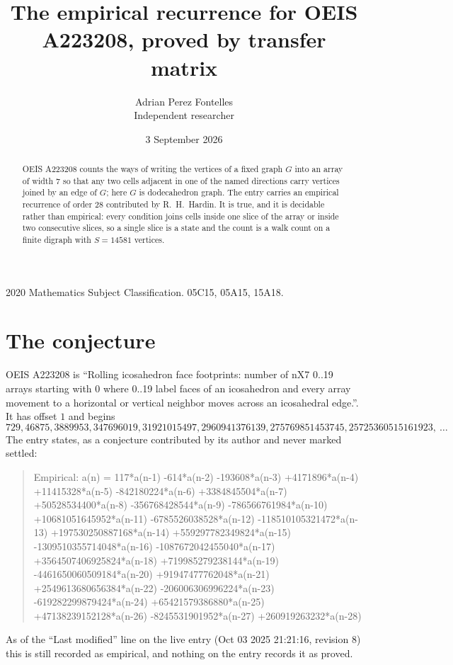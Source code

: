 \documentclass[11pt,a4paper]{article}
\title{The empirical recurrence for OEIS A223208, proved by transfer matrix}
\author{Adrian Perez Fontelles\\ \small Independent researcher}
\date{3 September 2026}
\theoremstyle{plain}
\theoremstyle{definition}
\begin{document}
\maketitle

\begin{abstract}
OEIS A223208 counts the ways of writing the vertices of a fixed graph $G$ into an array of width
$7$ so that any two cells adjacent in one of the named directions carry vertices joined by an
edge of $G$; here $G$ is dodecahedron graph. The entry carries an empirical recurrence of order $28$
contributed by R.~H.~Hardin. It is true, and it is decidable rather than empirical: every
condition joins cells inside one slice of the array or inside two consecutive slices, so a
single slice is a state and the count is a walk count on a finite digraph with $S=14581$ vertices.
\end{abstract}

\noindent\small 2020 Mathematics Subject Classification. 05C15, 05A15, 15A18.\normalsize

\section{The conjecture}

OEIS A223208 is ``Rolling icosahedron face footprints: number of nX7 0..19 arrays starting with 0 where 0..19 label faces of an icosahedron and every array movement to a horizontal or vertical neighbor moves across an icosahedral edge.''. It has offset $1$ and begins
\[
729, 46875, 3889953, 347696019, 31921015497, 2960941376139, 275769851453745, 25725360515161923,\ \dots
\]
The entry states, as a conjecture contributed by its author and never marked settled:
\begin{quote}
Empirical: a(n) = 117*a(n-1) -614*a(n-2) -193608*a(n-3) +4171896*a(n-4) +11415328*a(n-5) -842180224*a(n-6) +3384845504*a(n-7) +50528534400*a(n-8) -356768428544*a(n-9) -786566761984*a(n-10) +10681051645952*a(n-11) -6785526038528*a(n-12) -118510105321472*a(n-13) +197530250887168*a(n-14) +559297782349824*a(n-15) -1309510355714048*a(n-16) -1087672042455040*a(n-17) +3564507406925824*a(n-18) +719985279238144*a(n-19) -4461650060509184*a(n-20) +91947477762048*a(n-21) +2549613680656384*a(n-22) -206006306996224*a(n-23) -619282299879424*a(n-24) +65421579386880*a(n-25) +47138239152128*a(n-26) -8245531901952*a(n-27) +260919263232*a(n-28)
\end{quote}
As of the ``Last modified'' line on the live entry (Oct 03 2025 21:21:16, revision 8) this is still
recorded as empirical, and nothing on the entry records it as proved.
\end{document}
